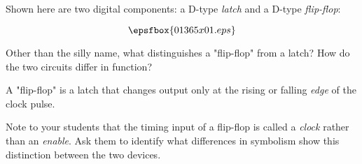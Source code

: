 

Shown here are two digital components: a D-type {\it latch} and a D-type {\it flip-flop}:

$$\epsfbox{01365x01.eps}$$

Other than the silly name, what distinguishes a "flip-flop" from a latch?  How do the two circuits differ in function? 







A "flip-flop" is a latch that changes output only at the rising or falling {\it edge} of the clock pulse.







Note to your students that the timing input of a flip-flop is called a {\it clock} rather than an {\it enable}.  Ask them to identify what differences in symbolism show this distinction between the two devices.




